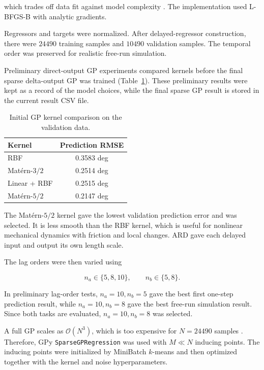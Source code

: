 which trades off data fit against model complexity \cite{course5sc28}.
The implementation used L-BFGS-B with analytic gradients.

Regressors and targets were normalized. After delayed-regressor
construction, there were \(24490\) training samples and \(10490\)
validation samples. The temporal order was preserved for realistic
free-run simulation.

Preliminary direct-output GP experiments compared kernels before the
final sparse delta-output GP was trained
(Table~\ref{tab:gp_kernel_comparison}). These preliminary results were
kept as a record of the model choices, while the final sparse GP result
is stored in the current result CSV file.

\begin{table}[htbp]
\caption{Initial GP kernel comparison on the validation data.}
\centering
\begin{tabular}{lc}
\toprule
Kernel & Prediction RMSE \\
\midrule
RBF & 0.3583 deg \\
Mat\'ern-\(3/2\) & 0.2514 deg \\
Linear + RBF & 0.2515 deg \\
Mat\'ern-\(5/2\) & 0.2147 deg \\
\bottomrule
\end{tabular}
\label{tab:gp_kernel_comparison}
\end{table}

The Mat\'ern-\(5/2\) kernel gave the lowest validation prediction error
and was selected. It is less smooth than the RBF kernel, which is useful
for nonlinear mechanical dynamics with friction and local changes. ARD
gave each delayed input and output its own length scale.

The lag orders were then varied using

\begin{equation}
n_a\in\{5,8,10\},
\qquad
n_b\in\{5,8\}.
\label{eq:gp_lag_grid}
\end{equation}

In preliminary lag-order tests, \(n_a=10,n_b=5\) gave the best first
one-step prediction result, while \(n_a=10,n_b=8\) gave the best
free-run simulation result. Since both tasks are evaluated,
\(n_a=10,n_b=8\) was selected.

A full GP scales as \(\mathcal{O}(N^3)\), which is too expensive for
\(N=24490\) samples \cite{course5sc28}. Therefore, GPy
\texttt{SparseGPRegression} was used with \(M\ll N\) inducing points.
The inducing points were initialized by MiniBatch \(k\)-means and then
optimized together with the kernel and noise hyperparameters.

